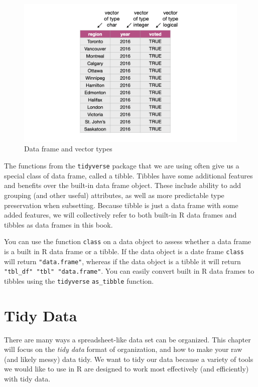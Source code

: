 \documentclass[
]{krantz}
\renewenvironment{quote}{\begin{VF}}{\end{VF}}
\begin{document}
\begin{figure}
\includegraphics[width=1\linewidth]{img/dataframe} \caption{Data frame and vector types}\label{fig:02-dataframe}
\end{figure}

The functions from the \texttt{tidyverse} package that we are using often give us a
special class of data frame, called a tibble. Tibbles have some additional
features and benefits over the built-in data frame object. These include
ability to add grouping (and other useful) attributes, as well as more
predictable type preservation when subsetting. Because tibble is just a data
frame with some added features, we will collectively refer to both built-in R
data frames and tibbles as data frames in this book.

\begin{quote}
You can use the function \texttt{class} on a data object to assess whether a data
frame is a built in R data frame or a tibble. If the data object is a date frame
\texttt{class} will return \texttt{"data.frame"}, whereas if the data object is a tibble it
will return \texttt{"tbl\_df"\ "tbl"\ "data.frame"}. You can easily convert built in R
data frames to tibbles using the \texttt{tidyverse} \texttt{as\_tibble} function.
\end{quote}

\hypertarget{tidy-data}{%
\section{Tidy Data}\label{tidy-data}}

There are many ways a spreadsheet-like data set can be organized. This chapter will focus on the \emph{tidy data} format of organization, and how to make your raw (and likely messy) data tidy. We want to tidy our data because a variety of tools we would like to use in R are designed to work most effectively (and efficiently) with tidy data.
\end{document}
